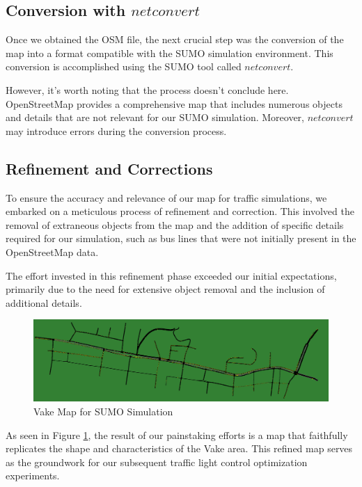 \subsection{Conversion with $netconvert$}
Once we obtained the OSM file, the next crucial step was the conversion of the map into a format compatible with the SUMO simulation environment. This conversion is accomplished using the SUMO tool called $netconvert$. 

However, it's worth noting that the process doesn't conclude here. OpenStreetMap provides a comprehensive map that includes numerous objects and details that are not relevant for our SUMO simulation. Moreover, $netconvert$ may introduce errors during the conversion process.

\newpage
\subsection{Refinement and Corrections}
To ensure the accuracy and relevance of our map for traffic simulations, we embarked on a meticulous process of refinement and correction. This involved the removal of extraneous objects from the map and the addition of specific details required for our simulation, such as bus lines that were not initially present in the OpenStreetMap data.

The effort invested in this refinement phase exceeded our initial expectations, primarily due to the need for extensive object removal and the inclusion of additional details.

\begin{figure}[h]
    \centering
    \includegraphics[width=1\linewidth]{images/methodology/vake-sumo.png}
    \caption{Vake Map for SUMO Simulation}
    \label{fig:vake-sumo}
\end{figure}

As seen in Figure \ref{fig:vake-sumo}, the result of our painstaking efforts is a map that faithfully replicates the shape and characteristics of the Vake area. This refined map serves as the groundwork for our subsequent traffic light control optimization experiments.

